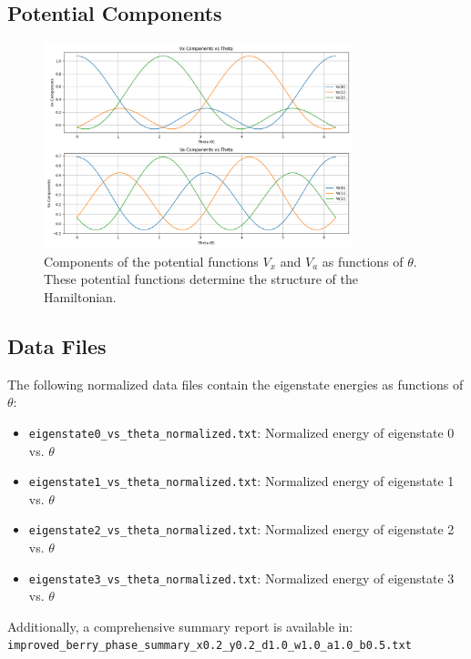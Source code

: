 \documentclass[12pt,a4paper]{article}
\begin{document}
\subsection{Potential Components}

\begin{figure}[H]
    \centering
    \includegraphics[width=0.8\textwidth]{improved_berry_phase_results/potential_components.png}
    \caption{Components of the potential functions $V_x$ and $V_a$ as functions of $\theta$. These potential functions determine the structure of the Hamiltonian.}
    \label{fig:potential_components}
\end{figure}

\subsection{Data Files}

The following normalized data files contain the eigenstate energies as functions of $\theta$:

\begin{itemize}
    \item \texttt{eigenstate0\_vs\_theta\_normalized.txt}: Normalized energy of eigenstate 0 vs. $\theta$
    \item \texttt{eigenstate1\_vs\_theta\_normalized.txt}: Normalized energy of eigenstate 1 vs. $\theta$
    \item \texttt{eigenstate2\_vs\_theta\_normalized.txt}: Normalized energy of eigenstate 2 vs. $\theta$
    \item \texttt{eigenstate3\_vs\_theta\_normalized.txt}: Normalized energy of eigenstate 3 vs. $\theta$
\end{itemize}

Additionally, a comprehensive summary report is available in:\\\texttt{improved\_berry\_phase\_summary\_x0.2\_y0.2\_d1.0\_w1.0\_a1.0\_b0.5.txt}
\end{document}
